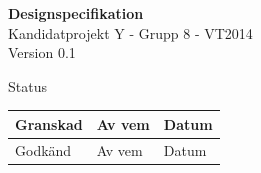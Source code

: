 \documentclass[a4paper,12pt,fleqn]{article}
\begin{document}
	\pagestyle{fancy}
	\vspace*{\fill}
		\begingroup
			\begin{center}
				\huge{\textbf{Designspecifikation}}
				\\
				\normalsize
				Kandidatprojekt Y - Grupp 8 - VT2014
				\\
				Version 0.1
				\end{center}
		\endgroup
	\vspace*{\fill}
	
	
	\begin{center} %
		Status
		\\
		\vspace{3pt} %
	    \begin{tabular}{| p{3cm} | p{3cm} | p{3cm} |} %
	    \hline %
	    Granskad & Av vem & Datum \\ \hline %
		Godkänd & Av vem & Datum \\ \hline %

	    \end{tabular}
	\end{center}
	\vspace{2cm}
	\newpage
	
\end{document}
